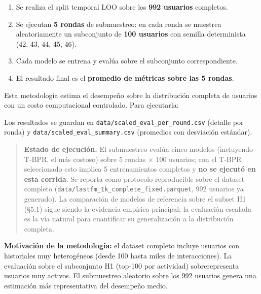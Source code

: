 \documentclass{article}
\providecommand{\tightlist}{%
  \setlength{\itemsep}{0pt}\setlength{\parskip}{0pt}}
\begin{document}
\begin{enumerate}
\def\labelenumi{\arabic{enumi}.}
\tightlist
\item
  Se realiza el split temporal LOO sobre los \textbf{992 usuarios} completos.
\item
  Se ejecutan \textbf{5 rondas} de submuestreo: en cada ronda se muestrea aleatoriamente un subconjunto de \textbf{100 usuarios} con semilla determinista (42, 43, 44, 45, 46).
\item
  Cada modelo se entrena y evalúa sobre el subconjunto correspondiente.
\item
  El resultado final es el \textbf{promedio de métricas sobre las 5 rondas}.
\end{enumerate}

Esta metodología estima el desempeño sobre la distribución completa de usuarios con un costo computacional controlado. Para ejecutarla:

\begin{Shaded}
\begin{Highlighting}[]
\end{Highlighting}
\end{Shaded}

Los resultados se guardan en \texttt{data/scaled\_eval\_per\_round.csv} (detalle por ronda) y \texttt{data/scaled\_eval\_summary.csv} (promedios con desviación estándar).

\begin{quote}
\textbf{Estado de ejecución.} El submuestreo evalúa cinco modelos (incluyendo T-BPR, el más costoso) sobre 5 rondas $\times$ 100 usuarios; con el T-BPR seleccionado esto implica 5 entrenamientos completos y \textbf{no se ejecutó en esta corrida}. Se reporta como protocolo reproducible sobre el dataset completo (\texttt{data/lastfm\_1k\_complete\_fixed.parquet}, 992 usuarios ya generado). La comparación de modelos de referencia sobre el subset H1 (§5.1) sigue siendo la evidencia empírica principal; la evaluación escalada es la vía natural para cuantificar su generalización a la distribución completa.
\end{quote}

\textbf{Motivación de la metodología:} el dataset completo incluye usuarios con historiales muy heterogéneos (desde 100 hasta miles de interacciones). La evaluación sobre el subconjunto H1 (top-100 por actividad) sobrerepresenta usuarios muy activos. El submuestreo aleatorio sobre los 992 usuarios genera una estimación más representativa del desempeño medio.
\end{document}

